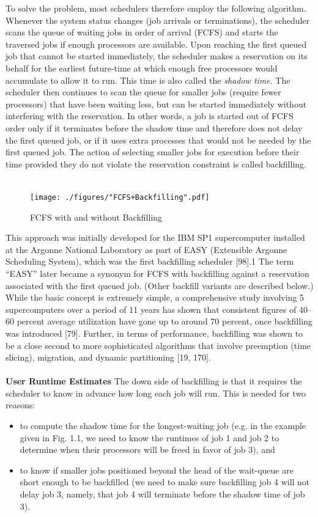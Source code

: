 To solve the problem, most schedulers therefore employ the following algorithm. Whenever the system status changes (job arrivals or terminations), the scheduler scans the queue of waiting jobs in order of arrival (FCFS) and starts the traversed jobs if enough processors are available. Upon reaching the first queued job that cannot be started immediately, the scheduler makes a reservation on its behalf for the earliest future-time at which enough free processors would accumulate to allow it to run. This time is also called the \textit{shadow time}. The scheduler then continues to scan the queue for smaller jobs (require fewer processors) that have been waiting less, but can be started immediately without interfering with the reservation. In other words, a job is started out of FCFS order only if it terminates before the shadow time and therefore does not delay the first queued job, or if it uses extra processes that would not be needed by the first queued job. The action of selecting smaller jobs for execution before their time provided they do not violate the reservation constraint is called backfilling.\\ \\
\begin{figure}[!htbp]
\centering
\texttt{[image: ./figures/"FCFS+Backfilling".pdf]}
\caption{FCFS with and without Backfilling}
\label{fig:2}
\end{figure}
This approach was initially developed for the IBM SP1 supercomputer installed at the Argonne National Laboratory as part of EASY (Extensible Argonne Scheduling System), which was the first backfilling scheduler [98].1 The term “EASY” later became a synonym for FCFS with backfilling against a reservation associated with the first queued job. (Other backfill variants are described below.) While the basic concept is extremely simple, a comprehensive study involving 5 supercomputers over a period of 11 years has shown that consistent figures of 40–60 percent average
utilization have gone up to around 70 percent, once backfilling was introduced [79]. Further, in terms of performance, backfilling was shown to be a close second to more sophisticated algorithms that involve preemption (time slicing), migration, and dynamic partitioning [19, 170].\\ \\
\textbf{User Runtime Estimates} The down side of backfilling is that it requires the scheduler to know in advance how long each job will run. This is needed for two reasons:
\begin{itemize}
\item to compute the shadow time for the longest-waiting job (e.g. in the example given in Fig. 1.1, we need to know the runtimes of job 1 and job 2 to determine when their processors will be freed in favor of job 3), and
\item to know if smaller jobs positioned beyond the head of the wait-queue are short enough to be backfilled (we need to make sure backfilling job 4 will not delay job 3, namely, that job 4 will terminate before the shadow time of job 3).
\end{itemize}
